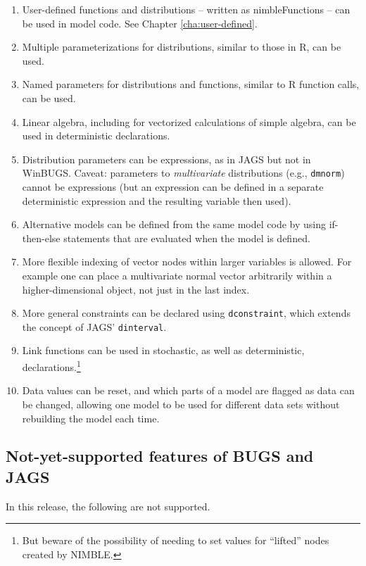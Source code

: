 \documentclass[12pt,oneside]{book}\usepackage[]{graphicx}\usepackage[]{color}
\def\cd#1{\texttt{#1}}
\begin{document}
\begin{enumerate}
  \item User-defined functions and distributions -- written as nimbleFunctions -- can be used in model code. See Chapter \ref{cha:user-defined}.
\item Multiple parameterizations for distributions, similar to those  in R, can be used.
\item Named parameters for distributions and functions, similar to R function calls, can be used.
\item Linear algebra, including for vectorized
  calculations of simple algebra, can be used in deterministic declarations.
\item Distribution parameters can be expressions, as in JAGS but not
  in WinBUGS.  Caveat: parameters to \emph{multivariate}
  distributions (e.g., \cd{dmnorm}) cannot be expressions (but an expression can be defined in a separate deterministic expression and the resulting variable then used). %
 \item Alternative models can be defined from the same model code by
   using if-then-else statements that are evaluated when the model is defined.
\item More flexible indexing of vector nodes within larger variables is allowed.  For example one can place a multivariate normal vector arbitrarily within a higher-dimensional object, not just in the last index.
\item More general constraints can be declared using \cd{dconstraint}, which extends the concept of JAGS' \cd{dinterval}.
 \item Link functions can be used in stochastic, as well as
   deterministic, declarations.\footnote{But beware of the possibility
     of needing to set values for ``lifted'' nodes created by NIMBLE.}
 \item Data values can be reset, and which parts of a model are flagged as data can be changed, allowing one model to be used for different data sets without rebuilding the model each time.
  \end{enumerate}
  
\subsection{Not-yet-supported features of BUGS and JAGS}
\label{sec:not-yet-supported}

In this release, the following are not supported.
\end{document}
